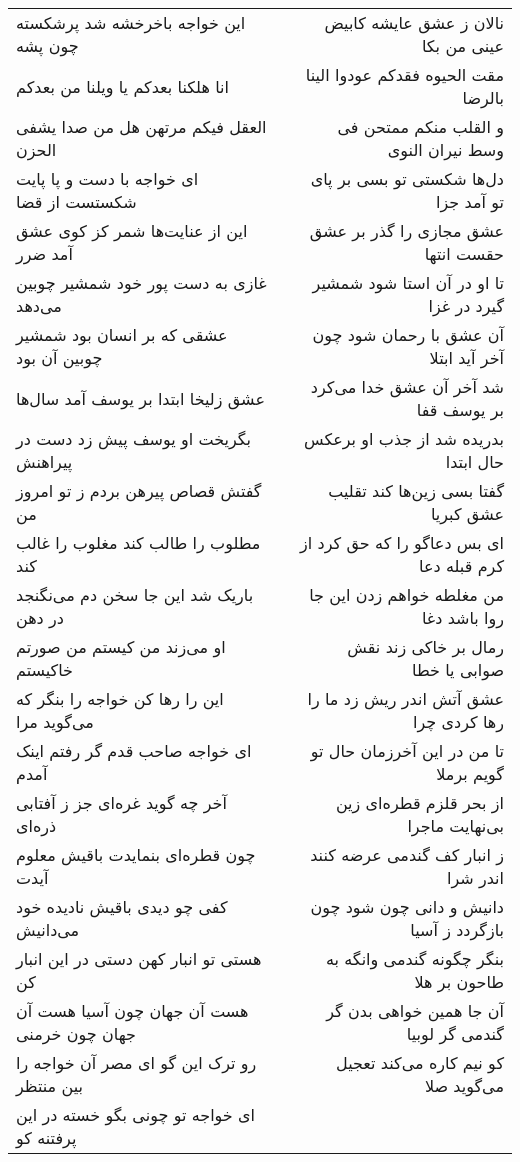 \begin{center}
\begin{longtable}{l p{0.5cm} r}
این خواجه باخرخشه شد پرشکسته چون پشه
&&
نالان ز عشق عایشه کابیض عینی من بکا
\\
انا هلکنا بعدکم یا ویلنا من بعدکم
&&
مقت الحیوه فقدکم عودوا الینا بالرضا
\\
العقل فیکم مرتهن هل من صدا یشفی الحزن
&&
و القلب منکم ممتحن فی وسط نیران النوی
\\
ای خواجه با دست و پا پایت شکستست از قضا
&&
دل‌ها شکستی تو بسی بر پای تو آمد جزا
\\
این از عنایت‌ها شمر کز کوی عشق آمد ضرر
&&
عشق مجازی را گذر بر عشق حقست انتها
\\
غازی به دست پور خود شمشیر چوبین می‌دهد
&&
تا او در آن استا شود شمشیر گیرد در غزا
\\
عشقی که بر انسان بود شمشیر چوبین آن بود
&&
آن عشق با رحمان شود چون آخر آید ابتلا
\\
عشق زلیخا ابتدا بر یوسف آمد سال‌ها
&&
شد آخر آن عشق خدا می‌کرد بر یوسف قفا
\\
بگریخت او یوسف پیش زد دست در پیراهنش
&&
بدریده شد از جذب او برعکس حال ابتدا
\\
گفتش قصاص پیرهن بردم ز تو امروز من
&&
گفتا بسی زین‌ها کند تقلیب عشق کبریا
\\
مطلوب را طالب کند مغلوب را غالب کند
&&
ای بس دعاگو را که حق کرد از کرم قبله دعا
\\
باریک شد این جا سخن دم می‌نگنجد در دهن
&&
من مغلطه خواهم زدن این جا روا باشد دغا
\\
او می‌زند من کیستم من صورتم خاکیستم
&&
رمال بر خاکی زند نقش صوابی یا خطا
\\
این را رها کن خواجه را بنگر که می‌گوید مرا
&&
عشق آتش اندر ریش زد ما را رها کردی چرا
\\
ای خواجه صاحب قدم گر رفتم اینک آمدم
&&
تا من در این آخرزمان حال تو گویم برملا
\\
آخر چه گوید غره‌ای جز ز آفتابی ذره‌ای
&&
از بحر قلزم قطره‌ای زین بی‌نهایت ماجرا
\\
چون قطره‌ای بنمایدت باقیش معلوم آیدت
&&
ز انبار کف گندمی عرضه کنند اندر شرا
\\
کفی چو دیدی باقیش نادیده خود می‌دانیش
&&
دانیش و دانی چون شود چون بازگردد ز آسیا
\\
هستی تو انبار کهن دستی در این انبار کن
&&
بنگر چگونه گندمی وانگه به طاحون بر هلا
\\
هست آن جهان چون آسیا هست آن جهان چون خرمنی
&&
آن جا همین خواهی بدن گر گندمی گر لوبیا
\\
رو ترک این گو ای مصر آن خواجه را بین منتظر
&&
کو نیم کاره می‌کند تعجیل می‌گوید صلا
\\
ای خواجه تو چونی بگو خسته در این پرفتنه کو

\end{longtable}
\end{center}
